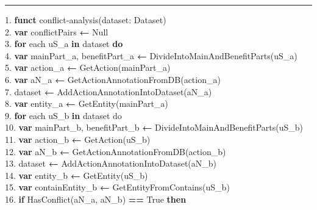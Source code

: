 \begin{MyListing}
	\scriptsize
	\hrule
	\begin{flushleft}
	 1. \textbf{funct} conflict-analysis(dataset: Dataset)\\
	 2. \hspace{12pt}\textbf{var} conflictPairs \textbf{←} Null\\
	 3. \hspace{12pt}\textbf{for} each uS\_a \textbf{in} dataset \textbf{do}	\\
	 4. \hspace{20pt}\textbf{var} mainPart\_a, benefitPart\_a \textbf{←} DivideIntoMainAndBenefitParts(uS\_a)\\
	 5. \hspace{20pt}\textbf{var} action\_a \textbf{←} GetAction(mainPart\_a)\\ 
	 6. \hspace{20pt}\textbf{var} aN\_a \textbf{←} GetActionAnnotationFromDB(action\_a)\\
	 7. \hspace{20pt}dataset  \textbf{←} AddActionAnnotationIntoDataset(aN\_a)\\
	 8. \hspace{20pt}\textbf{var} entity\_a \textbf{←} GetEntity(mainPart\_a)\\
	 9. \hspace{20pt}\textbf{for} each uS\_b \textbf{in} dataset do\\
	 10. \hspace{26pt}\textbf{var} mainPart\_b, benefitPart\_b \textbf{←}  DivideIntoMainAndBenefitParts(uS\_b)\\
	 11. \hspace{26pt}\textbf{var} action\_b \textbf{←} GetAction(uS\_b)\\ 
	 12. \hspace{26pt}\textbf{var} aN\_b \textbf{←} GetActionAnnotationFromDB(action\_b)\\
	 13. \hspace{26pt}dataset  \textbf{←} AddActionAnnotationIntoDataset(aN\_b)\\
	 14. \hspace{26pt}\textbf{var} entity\_b \textbf{←} GetEntity(uS\_b)\\
	 15. \hspace{26pt}\textbf{var} containEntity\_b \textbf{←}  GetEntityFromContains(uS\_b)\\
	 16. \hspace{26pt}\textbf{if} HasConflict(aN\_a, aN\_b) \textbf{==} True \textbf{then}\\

\end{flushleft}
\end{MyListing}

